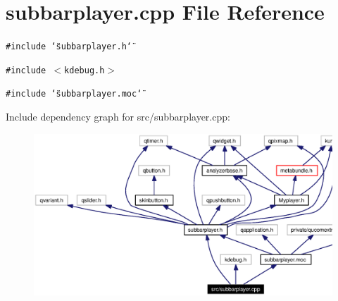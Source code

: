 \section{subbarplayer.cpp File Reference}
\label{src_2subbarplayer_8cpp}


{\tt \#include \char`\"{}subbarplayer.h\char`\"{}}\par
{\tt \#include $<$kdebug.h$>$}\par
{\tt \#include \char`\"{}subbarplayer.moc\char`\"{}}\par


Include dependency graph for src/subbarplayer.cpp:\begin{figure}[H]
\begin{center}
\leavevmode
\includegraphics[width=364pt]{src_2subbarplayer_8cpp__incl}
\end{center}
\end{figure}
